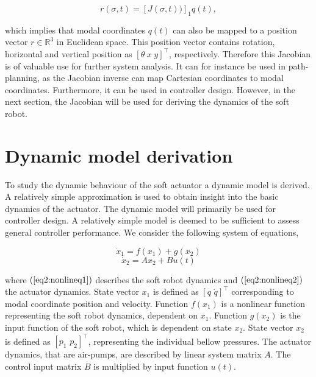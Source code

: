 \begin{equation}
    r(\sigma,t) = [J(\sigma,t))]_1q(t),
\end{equation}

which implies that modal coordinates $q(t)$ can also be mapped to a position vector $r\in \mathbb{R}^3$ in Euclidean space. This position vector contains rotation, horizontal and vertical position as $[\theta \hspace{3pt} x \hspace{3pt} y]^\top$, respectively. Therefore this Jacobian is of valuable use for further system analysis. It can for instance be used in path-planning, as the Jacobian inverse can map Cartesian coordinates to modal coordinates. Furthermore, it can be used in controller design. However, in the next section, the Jacobian will be used for deriving the dynamics of the soft robot. 


\section{Dynamic model derivation}






To study the dynamic behaviour of the soft actuator a dynamic model is derived. A relatively simple approximation is used to obtain insight into the basic dynamics of the actuator. The dynamic model will primarily be used for controller design. A relatively simple model is deemed to be sufficient to assess general controller performance. We consider the following system of equations,

\begin{equation}
    \dot{x}_1  = f(x_1) + g(x_2) 
       \label{eq2:nonlineq1}
    \end{equation}
    \begin{equation}
    \dot{x}_2 = Ax_2 + Bu(t)  
    \label{eq2:nonlineq2}
\end{equation}

where $(\ref{eq2:nonlineq1})$ describes the soft robot dynamics and $(\ref{eq2:nonlineq2})$ the actuator dynamics. State vector $x_1$ is defined as $[ q \hspace{4pt} \dot{q} ]^\top$ corresponding to modal coordinate position and velocity. Function $f(x_1)$ is a nonlinear function representing the soft robot dynamics, dependent on $x_1$. Function $g(x_2)$ is the input function of the soft robot, which is dependent on state $x_2$. State vector $x_2$ is defined as $[ p_1 \hspace{4pt} p_2 ]^\top$, representing the individual bellow pressures. The actuator dynamics, that are air-pumps, are described by linear system matrix $A$. The control input matrix $B$ is multiplied by input function $u(t)$.

